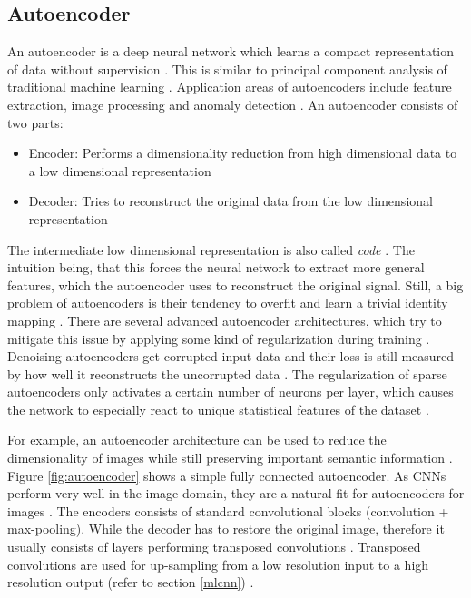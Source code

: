 \documentclass[draft,final,oneside]{vutinfth} %
\begin{document}
\subsection{Autoencoder}\label{autoencodersection}

An autoencoder is a deep neural network which learns a compact representation of data without supervision \cite{Goodfellow-et-al-2016}. This is similar to principal component analysis of traditional machine learning \cite{bishop}. Application areas of autoencoders include feature extraction, image processing and anomaly detection \cite{semantichashing}\cite{anomalydetection}\cite{autoencoderimage}\cite{autoencoderfeatureextraction}. An autoencoder consists of two parts:

\begin{itemize}
\item Encoder: Performs a dimensionality reduction from high dimensional data to a low dimensional representation \cite{Goodfellow-et-al-2016}
\item Decoder: Tries to reconstruct the original data from the low dimensional representation \cite{Goodfellow-et-al-2016}
\end{itemize}

The intermediate low dimensional representation is also called \textit{code} \cite{Goodfellow-et-al-2016}. The intuition being, that this forces the neural network to extract more general features, which the autoencoder uses to reconstruct the original signal. Still, a big problem of autoencoders is their tendency to overfit and learn a trivial identity mapping \cite{Goodfellow-et-al-2016}. There are several advanced autoencoder architectures, which try to mitigate this issue by applying some kind of regularization during training \cite{Goodfellow-et-al-2016}. Denoising autoencoders get corrupted input data and their loss is still measured by how well it reconstructs the uncorrupted data \cite{denoisingautoencoder}. The regularization of sparse autoencoders only activates a certain number of neurons per layer, which causes the network to especially react to unique statistical features of the dataset \cite{sparseautoencoder}.

For example, an autoencoder architecture can be used to reduce the dimensionality of images while still preserving important semantic information \cite{convolutionalautoencoder}. Figure \ref{fig:autoencoder} shows a simple fully connected autoencoder. As CNNs perform very well in the image domain, they are a natural fit for autoencoders for images \cite{alexnet}. The encoders consists of standard convolutional blocks (convolution + max-pooling). While the decoder has to restore the original image, therefore it usually consists of layers performing transposed convolutions \cite{Goodfellow-et-al-2016}. Transposed convolutions are used for up-sampling from a low resolution input to a high resolution output (refer to section \ref{mlcnn}) \cite{dlvc}. 
\end{document}
